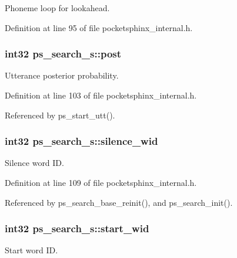 Phoneme loop for lookahead. 



Definition at line 95 of file pocketsphinx\+\_\+internal.\+h.

\subsubsection[{post}]{\setlength{\rightskip}{0pt plus 5cm}int32 ps\+\_\+search\+\_\+s\+::post}\label{structps__search__s_a721a656d0e34f7604ea8c52a1bdf14ff}


Utterance posterior probability. 



Definition at line 103 of file pocketsphinx\+\_\+internal.\+h.



Referenced by ps\+\_\+start\+\_\+utt().

\subsubsection[{silence\+\_\+wid}]{\setlength{\rightskip}{0pt plus 5cm}int32 ps\+\_\+search\+\_\+s\+::silence\+\_\+wid}\label{structps__search__s_ab6851b4675f38ab6b3683d75521f000b}


Silence word I\+D. 



Definition at line 109 of file pocketsphinx\+\_\+internal.\+h.



Referenced by ps\+\_\+search\+\_\+base\+\_\+reinit(), and ps\+\_\+search\+\_\+init().

\subsubsection[{start\+\_\+wid}]{\setlength{\rightskip}{0pt plus 5cm}int32 ps\+\_\+search\+\_\+s\+::start\+\_\+wid}\label{structps__search__s_ae1a9fa33bfc851ec91ce96870714b3cc}


Start word I\+D. 



